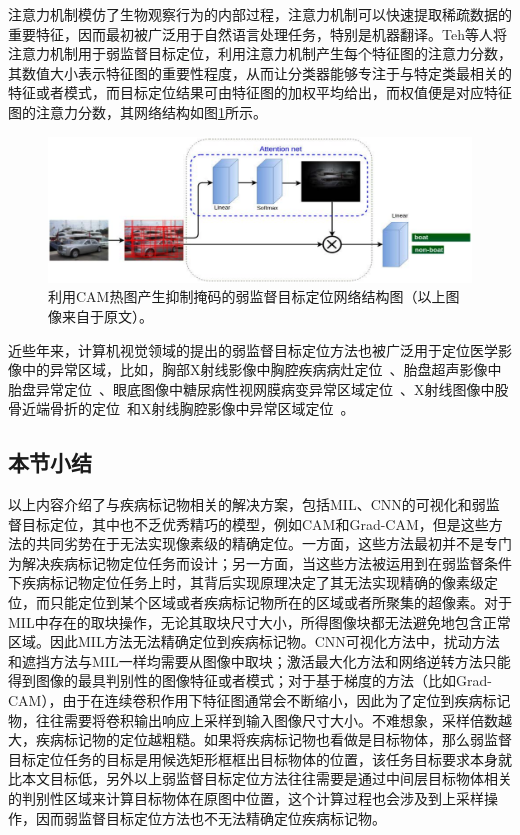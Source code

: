 注意力机制模仿了生物观察行为的内部过程，注意力机制可以快速提取稀疏数据的重要特征，因而最初被广泛用于自然语言处理任务，特别是机器翻译。Teh等人\cite{BMVC2016_52}将注意力机制用于弱监督目标定位，利用注意力机制产生每个特征图的注意力分数，其数值大小表示特征图的重要性程度，从而让分类器能够专注于与特定类最相关的特征或者模式，而目标定位结果可由特征图的加权平均给出，而权值便是对应特征图的注意力分数，其网络结构如图\ref{fig:attention_weakly_supervised_object_localization}所示。
\vspace{-0.2cm}
\begin{figure}[h]
	\centering
	\includegraphics[width=1.0\textwidth]{figure/attention_weakly_supervised_object_localization}
	\caption{利用CAM热图产生抑制掩码的弱监督目标定位网络结构图（以上图像来自于原文）。} 
	\label{fig:attention_weakly_supervised_object_localization}
\end{figure}

近些年来，计算机视觉领域的提出的弱监督目标定位方法也被广泛用于定位医学影像中的异常区域，比如，胸部X射线影像中胸腔疾病病灶定位~\cite{WangPLLBS17}、胎盘超声影像中胎盘异常定位~\cite{Qi2017WeaklySL}、眼底图像中糖尿病性视网膜病变异常区域定位~\cite{GonzlezGonzalo2018ImprovingWL}、X射线图像中股骨近端骨折的定位~\cite{JimnezSnchez2018WeaklySupervisedLA}和X射线胸腔影像中异常区域定位~\cite{Yao2018WeaklySM, Tang2018AttentionGuidedCL}。


\subsection{本节小结}\label{subsec:related_work_summary}
以上内容介绍了与疾病标记物相关的解决方案，包括MIL、CNN的可视化和弱监督目标定位，其中也不乏优秀精巧的模型，例如CAM和Grad-CAM，但是这些方法的共同劣势在于无法实现像素级的精确定位。一方面，这些方法最初并不是专门为解决疾病标记物定位任务而设计；另一方面，当这些方法被运用到在弱监督条件下疾病标记物定位任务上时，其背后实现原理决定了其无法实现精确的像素级定位，而只能定位到某个区域或者疾病标记物所在的区域或者所聚集的超像素。对于MIL中存在的取块操作，无论其取块尺寸大小，所得图像块都无法避免地包含正常区域。因此MIL方法无法精确定位到疾病标记物。CNN可视化方法中，扰动方法和遮挡方法与MIL一样均需要从图像中取块；激活最大化方法和网络逆转方法只能得到图像的最具判别性的图像特征或者模式；对于基于梯度的方法（比如Grad-CAM），由于在连续卷积作用下特征图通常会不断缩小，因此为了定位到疾病标记物，往往需要将卷积输出响应上采样到输入图像尺寸大小。不难想象，采样倍数越大，疾病标记物的定位越粗糙。如果将疾病标记物也看做是目标物体，那么弱监督目标定位任务的目标是用候选矩形框框出目标物体的位置，该任务目标要求本身就比本文目标低，另外以上弱监督目标定位方法往往需要是通过中间层目标物体相关的判别性区域来计算目标物体在原图中位置，这个计算过程也会涉及到上采样操作，因而弱监督目标定位方法也不无法精确定位疾病标记物。

